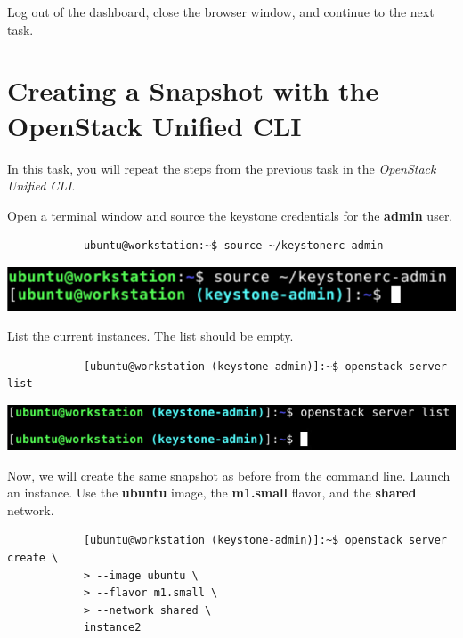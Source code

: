 \documentclass[letterpaper, 12pt]{article}
\begin{document}
\begin{enumerate}
    \begin{labstep}
        Log out of the dashboard, close the browser window, and continue to the next task.
    \end{labstep}
\end{enumerate}

\section{Creating a Snapshot with the OpenStack Unified CLI}\label{sec:creating-a-snapshot-with-the-openstack-unified-cli}
In this task, you will repeat the steps from the previous task in the \textit{OpenStack Unified CLI}.

\begin{enumerate}
    \begin{labstep}
        Open a terminal window and source the keystone credentials for the \textbf{admin} user.
        \begin{lstlisting}
            ubuntu@workstation:~$ source ~/keystonerc-admin
        \end{lstlisting}

        \begin{center}
            \includegraphics[width=\linewidth]{images/part2/step1.png}
        \end{center}
    \end{labstep}

    \begin{labstep}
        List the current instances.
        The list should be empty.
        \begin{lstlisting}
            [ubuntu@workstation (keystone-admin)]:~$ openstack server list
        \end{lstlisting}

        \begin{center}
            \includegraphics[width=\linewidth]{images/part2/step2.png}
        \end{center}
    \end{labstep}

    \begin{labstep}
        Now, we will create the same snapshot as before from the command line.
        Launch an instance.
        Use the \textbf{ubuntu} image, the \textbf{m1.small} flavor, and the \textbf{shared} network.
        \begin{lstlisting}
            [ubuntu@workstation (keystone-admin)]:~$ openstack server create \
            > --image ubuntu \
            > --flavor m1.small \
            > --network shared \
            instance2
        \end{lstlisting}


\end{labstep}
\end{enumerate}
\end{document}
